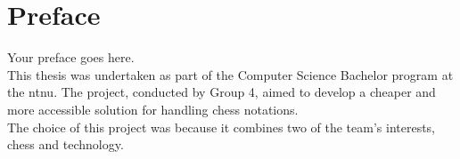 \chapter*{Preface}
Your preface goes here.\\

This thesis was undertaken as part of the Computer Science Bachelor program at the \gls{ntnu}. The project, conducted by Group 4, aimed to develop a cheaper and more accessible solution for handling chess notations. \\

The choice of this project was because it combines two of the team's interests, chess and technology.